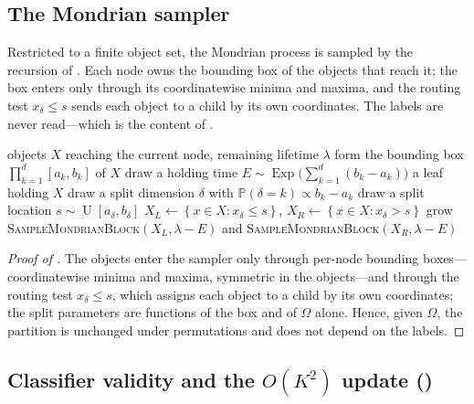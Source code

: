 \documentclass[twoside]{article}
\numberwithin{equation}{section}
\theoremstyle{plain}
\theoremstyle{definition}
\theoremstyle{remark}
\DeclareMathOperator{\ExpDist}{Exp}
\DeclareMathOperator{\UnifDist}{U}
\newcommand{\set}[1]{\left\{#1\right\}}
\newcommand{\abs}[1]{\left\lvert #1 \right\rvert}
\begin{document}
\subsection{The Mondrian sampler}\label{app:sampler}

Restricted to a finite object set, the Mondrian process is sampled by the recursion of
. Each node owns the bounding box of the objects that reach
it; the box enters only through its coordinatewise minima and maxima, and the routing
test $x_\delta \le s$ sends each object to a child by its own coordinates. The labels
are never read---which is the content of .

\begin{algorithm}[t]
\caption{\textsc{SampleMondrianBlock}: recursive Mondrian sampler on a finite object set.}
\label{alg:mondrian-sampler}
\begin{algorithmic}[1]
\Require objects $X$ reaching the current node, remaining lifetime $\lambda$
\State form the bounding box $\prod_{k=1}^{d} [a_k, b_k]$ of $X$ 
\State draw a holding time $E \sim \ExpDist\!\bigl(\textstyle\sum_{k=1}^{d} (b_k - a_k)\bigr)$
\If{$E > \lambda$ or $\abs{X} \le 1$}
  \State \Return a leaf holding $X$
\EndIf
\State draw a split dimension $\delta$ with $\mathbb{P}(\delta = k) \propto b_k - a_k$
\State draw a split location $s \sim \UnifDist[a_\delta, b_\delta]$
\State $X_L \gets \set{x \in X : x_\delta \le s}$, \quad $X_R \gets \set{x \in X : x_\delta > s}$
\State grow \textsc{SampleMondrianBlock}$(X_L, \lambda - E)$ and \textsc{SampleMondrianBlock}$(X_R, \lambda - E)$
\end{algorithmic}
\end{algorithm}

\begin{proof}[Proof of ]
The objects enter the sampler only through per-node bounding boxes---coordinatewise minima and maxima, symmetric in the objects---and through the
routing test $x_\delta \le s$, which assigns each object to a child
by its own coordinates; the split parameters are functions of the box and of
$\Omega$ alone. Hence, given $\Omega$, the partition is unchanged under
permutations and does not depend on the labels.
\end{proof}

\subsection{Classifier validity and the $O(K^2)$ update ()}\label{app:cls}
\end{document}

